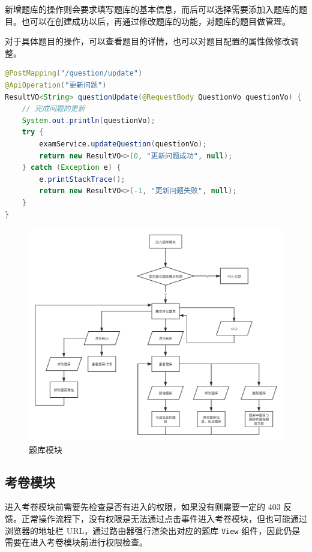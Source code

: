 新增题库的操作则会要求填写题库的基本信息，而后可以选择需要添加入题库的题目。也可以在创建成功以后，再通过修改题库的功能，对题库的题目做管理。

对于具体题目的操作，可以查看题目的详情，也可以对题目配置的属性做修改调整。

\begin{lstlisting}[language=Java]
@PostMapping("/question/update")
@ApiOperation("更新问题")
ResultVO<String> questionUpdate(@RequestBody QuestionVo questionVo) {
    // 完成问题的更新
    System.out.println(questionVo);
    try {
        examService.updateQuestion(questionVo);
        return new ResultVO<>(0, "更新问题成功", null);
    } catch (Exception e) {
        e.printStackTrace();
        return new ResultVO<>(-1, "更新问题失败", null);
    }
}
\end{lstlisting}

\begin{figure}[htb]
    \centering
    \includegraphics[width=\linewidth]{_images/题库模块.png}
    \caption{题库模块}
\end{figure}


\subsection{考卷模块}
进入考卷模块前需要先检查是否有进入的权限，如果没有则需要一定的 403 反馈。正常操作流程下，没有权限是无法通过点击事件进入考卷模块，但也可能通过浏览器的地址栏 URL，通过路由器强行渲染出对应的题库 \lstinline!View! 组件，因此仍是需要在进入考卷模块前进行权限检查。

